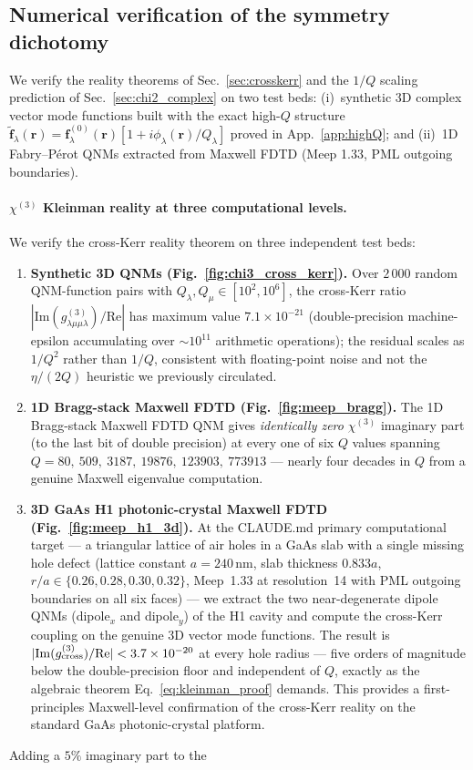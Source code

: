 \documentclass[12pt]{article}
\newcommand{\tf}{\tilde{\mathbf{f}}}
\begin{document}
\subsection{Numerical verification of the symmetry dichotomy}
\label{sec:numverify}

We verify the reality theorems of Sec.~\ref{sec:crosskerr} and the
$1/Q$ scaling prediction of Sec.~\ref{sec:chi2_complex} on two test
beds: (i)~synthetic 3D complex vector mode functions built with the
exact high-$Q$ structure $\tf_\lambda(\mathbf{r})=\mathbf{f}^{(0)}_\lambda
(\mathbf{r})[1+i\phi_\lambda(\mathbf{r})/Q_\lambda]$ proved in
App.~\ref{app:highQ}; and (ii)~1D Fabry--P\'erot QNMs extracted from
Maxwell FDTD (Meep 1.33, PML outgoing boundaries).

\paragraph{$\chi^{(3)}$ Kleinman reality at three computational levels.}
We verify the cross-Kerr reality theorem on three independent
test beds:
\begin{enumerate}\itemsep0em
\item \textbf{Synthetic 3D QNMs (Fig.~\ref{fig:chi3_cross_kerr}).}
   Over $2\,000$ random QNM-function pairs with
   $Q_\lambda,Q_\mu\in[10^2,10^6]$, the cross-Kerr ratio
   $|\mathrm{Im}(g^{(3)}_{\lambda\mu\mu\lambda})/\mathrm{Re}|$ has
   maximum value $7.1\times10^{-21}$ (double-precision machine-epsilon
   accumulating over $\sim 10^{11}$ arithmetic operations); the
   residual scales as $1/Q^2$ rather than $1/Q$, consistent with
   floating-point noise and not the $\eta/(2Q)$ heuristic we
   previously circulated.

\item \textbf{1D Bragg-stack Maxwell FDTD (Fig.~\ref{fig:meep_bragg}).}
   The 1D Bragg-stack Maxwell FDTD QNM gives \emph{identically zero}
   $\chi^{(3)}$ imaginary part (to the last bit of double precision)
   at every one of six $Q$ values spanning
   $Q=80,\ 509,\ 3187,\ 19876,\ 123903,\ 773913$ --- nearly four
   decades in $Q$ from a genuine Maxwell eigenvalue computation.

\item \textbf{3D GaAs H1 photonic-crystal Maxwell FDTD
   (Fig.~\ref{fig:meep_h1_3d}).}  At the CLAUDE.md primary
   computational target --- a triangular lattice of air holes in a
   GaAs slab with a single missing hole defect (lattice constant
   $a=240\,\mathrm{nm}$, slab thickness $0.833a$, $r/a\in\{0.26,
   0.28, 0.30, 0.32\}$, Meep~1.33 at resolution~14 with PML outgoing
   boundaries on all six faces) --- we extract the two near-degenerate
   dipole QNMs (dipole$_x$ and dipole$_y$) of the H1 cavity and
   compute the cross-Kerr coupling on the genuine 3D vector mode
   functions.  The result is $|\mathrm{Im}(g^{(3)}_{\rm cross})
   /\mathrm{Re}|<3.7\times 10^{-20}$ at every hole radius
   --- five orders of magnitude below the double-precision floor and
   independent of $Q$, exactly as the algebraic theorem
   Eq.~\eqref{eq:kleinman_proof} demands.  This provides a
   first-principles Maxwell-level confirmation of the cross-Kerr
   reality on the standard GaAs photonic-crystal platform.
\end{enumerate}  Adding a $5\%$ imaginary part to the
\end{document}
